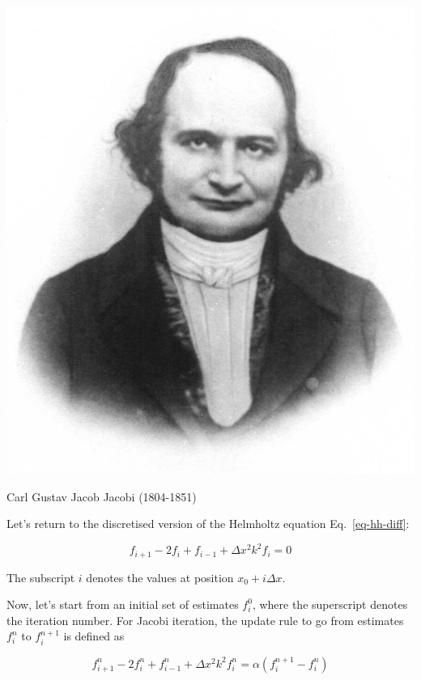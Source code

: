 
\begin{marginfigure}[0.0cm]
  \includegraphics{numeric/figures/c_jacobi}
  \caption{Carl Gustav Jacob Jacobi (1804-1851)}
\end{marginfigure}

Let's return to the discretised version of the Helmholtz equation Eq.~\ref{eq-hh-diff}:

\begin{equation}
f_{i+1} -2 f_i + f_{i-1} + \Delta x^2 k^2 f_i = 0 \label{eq-hh-diff-2}
\end{equation}  

The subscript $i$ denotes the values at position $x_0 + i \Delta x$.

Now, let's start from an initial set of estimates $f_i^0$, where the superscript denotes the iteration number. For Jacobi iteration, the update rule to go from estimates $f_i^n$ to $ f_i^{n+1}$ is defined as

\begin{equation}
f_{i+1}^n -2 f_i^n + f_{i-1}^n + \Delta x^2 k^2 f_i^n = \alpha (f_i^{n+1} - f_i^n ) \label{eq-jacobi}
\end{equation}  

